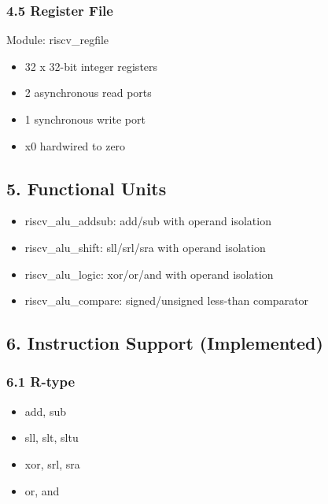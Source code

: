 \documentclass[]{article}
\providecommand{\tightlist}{%
  \setlength{\itemsep}{0pt}\setlength{\parskip}{0pt}}
\begin{document}
\hypertarget{45-register-file}{%
\subsubsection{4.5 Register File}\label{45-register-file}}

Module: riscv\_regfile

\begin{itemize}
\tightlist
\item
  32 x 32-bit integer registers
\item
  2 asynchronous read ports
\item
  1 synchronous write port
\item
  x0 hardwired to zero
\end{itemize}

\hypertarget{5-functional-units}{%
\subsection{5. Functional Units}\label{5-functional-units}}

\begin{itemize}
\tightlist
\item
  riscv\_alu\_addsub: add/sub with operand isolation
\item
  riscv\_alu\_shift: sll/srl/sra with operand isolation
\item
  riscv\_alu\_logic: xor/or/and with operand isolation
\item
  riscv\_alu\_compare: signed/unsigned less-than comparator
\end{itemize}

\hypertarget{6-instruction-support-implemented}{%
\subsection{6. Instruction Support
(Implemented)}\label{6-instruction-support-implemented}}

\hypertarget{61-r-type}{%
\subsubsection{6.1 R-type}\label{61-r-type}}

\begin{itemize}
\tightlist
\item
  add, sub
\item
  sll, slt, sltu
\item
  xor, srl, sra
\item
  or, and
\end{itemize}
\end{document}

